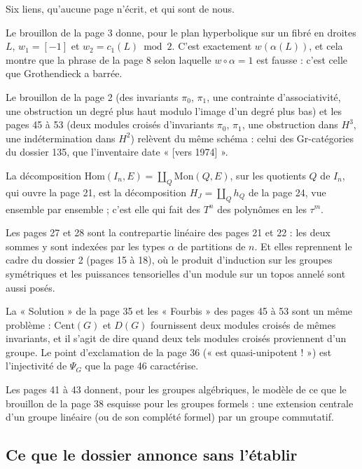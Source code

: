 \documentclass[11pt,a4paper]{article}
\begin{document}
Six liens, qu'aucune page n'écrit, et qui sont de nous.

Le brouillon de la page 3 donne, pour le plan hyperbolique sur un fibré en
droites $L$, $w_1 = [-1]$ et $w_2 = c_1(L) \bmod 2$. C'est exactement
$w(\alpha(L))$, et cela montre que la phrase de la page 8 selon laquelle
$w \circ \alpha = 1$ est fausse : c'est celle que Grothendieck a barrée.

Le brouillon de la page 2 (des invariants $\pi_0$, $\pi_1$, une contrainte
d'associativité, une obstruction un degré plus haut modulo l'image d'un
degré plus bas) et les pages 45 à 53 (deux modules croisés d'invariants
$\pi_0$, $\pi_1$, une obstruction dans $H^{3}$, une indétermination dans
$H^{2}$) relèvent du même schéma : celui des Gr-catégories du dossier 135,
que l'inventaire date « [vers 1974] ».

La décomposition $\mathrm{Hom}(I_n, E) = \coprod_{Q} \mathrm{Mon}(Q, E)$,
sur les quotients $Q$ de $I_n$, qui ouvre la page 21, est la décomposition
$H_J = \coprod_Q h_Q$ de la page 24, vue ensemble par ensemble ; c'est elle
qui fait des $T^{n}$ des polynômes en les $\tau^{m}$.

Les pages 27 et 28 sont la contrepartie linéaire des pages 21 et 22 : les
deux sommes y sont indexées par les types $\alpha$ de partitions de $n$. Et
elles reprennent le cadre du dossier 2 (pages 15 à 18), où le produit
d'induction sur les groupes symétriques et les puissances tensorielles
d'un module sur un topos annelé sont aussi posés.

La « Solution » de la page 35 et les « Fourbis » des pages 45 à 53 sont un
même problème : $\mathrm{Cent}(G)$ et $D(G)$ fournissent deux modules
croisés de mêmes invariants, et il s'agit de dire quand deux tels modules
croisés proviennent d'un groupe. Le point d'exclamation de la page 36
(« est quasi-unipotent ! ») est l'injectivité de $\Psi_G$ que la page 46
caractérise.

Les pages 41 à 43 donnent, pour les groupes algébriques, le modèle de ce que
le brouillon de la page 38 esquisse pour les groupes formels : une extension
centrale d'un groupe linéaire (ou de son complété formel) par un groupe
commutatif.

\subsection*{Ce que le dossier annonce sans l'établir}
\end{document}
